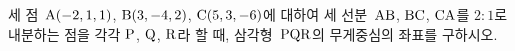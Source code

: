세 점~$\mathrm{A}(-2{,}\mkern3mu\mathopen{}1{,}\mkern3mu\mathopen{}1)$, $\mathrm{B}(3{,}\mkern3mu\mathopen{}-4{,}\mkern3mu\mathopen{}2)$, $\mathrm{C}(5{,}\mkern3mu\mathopen{}3{,}\mkern3mu\mathopen{}-6)$에 대하여 세 선분~$\mathrm{AB}$, $\mathrm{BC}$, $\mathrm{CA}$를 $2:1$로 내분하는 점을 각각 $\mathrm{P}$, $\mathrm{Q}$, $\mathrm{R}$라 할 때, 삼각형~$\mathrm{PQR}$의 무게중심의 좌표를 구하시오.

